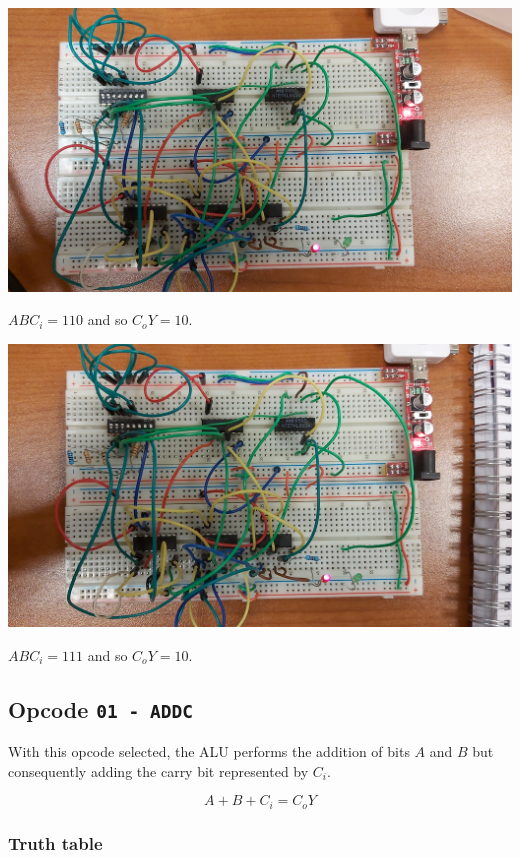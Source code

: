 \documentclass{article}
\begin{document}
\includegraphics[width=\textwidth]{./figures/11000.jpg}
\begin{center}
	$ABC_i = 110$ and so $C_o Y= 10$.
\end{center}

\vspace{2em}

\includegraphics[width=\textwidth]{./figures/11100.jpg}
\begin{center}
	$ABC_i = 111$ and so $C_o Y= 10$.
\end{center}


\subsection{Opcode \texttt{01 - ADDC}}

With this opcode selected, the ALU performs the addition of bits $A$ and $B$ but consequently
adding the carry bit represented by $C_i$.

\[A+B+C_i = C_o Y\]

\vspace{9em}

\subsubsection{Truth table}
\end{document}
